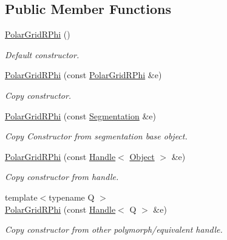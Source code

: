 \subsection*{Public Member Functions}
\begin{DoxyCompactItemize}
\item 
\hyperlink{class_d_d4hep_1_1_geometry_1_1_polar_grid_r_phi_a1943b006410ada69da167db39a382427}{PolarGridRPhi} ()
\begin{DoxyCompactList}\small\item\em Default constructor. \item\end{DoxyCompactList}\item 
\hyperlink{class_d_d4hep_1_1_geometry_1_1_polar_grid_r_phi_ad5916c16a7d6a1b66bb68c752ceae0ad}{PolarGridRPhi} (const \hyperlink{class_d_d4hep_1_1_geometry_1_1_polar_grid_r_phi}{PolarGridRPhi} \&e)
\begin{DoxyCompactList}\small\item\em Copy constructor. \item\end{DoxyCompactList}\item 
\hyperlink{class_d_d4hep_1_1_geometry_1_1_polar_grid_r_phi_aec8a817c925fdd0146eaf53c612e32e4}{PolarGridRPhi} (const \hyperlink{class_d_d4hep_1_1_geometry_1_1_segmentation}{Segmentation} \&e)
\begin{DoxyCompactList}\small\item\em Copy Constructor from segmentation base object. \item\end{DoxyCompactList}\item 
\hyperlink{class_d_d4hep_1_1_geometry_1_1_polar_grid_r_phi_ab27807b9812126c2574356c71dee5c15}{PolarGridRPhi} (const \hyperlink{class_d_d4hep_1_1_handle}{Handle}$<$ \hyperlink{class_t}{Object} $>$ \&e)
\begin{DoxyCompactList}\small\item\em Copy constructor from handle. \item\end{DoxyCompactList}\item 
{\footnotesize template$<$typename Q $>$ }\\\hyperlink{class_d_d4hep_1_1_geometry_1_1_polar_grid_r_phi_a0a844c67b09ed51648cba4547348ab04}{PolarGridRPhi} (const \hyperlink{class_d_d4hep_1_1_handle}{Handle}$<$ Q $>$ \&e)
\begin{DoxyCompactList}\small\item\em Copy constructor from other polymorph/equivalent handle. \item\end{DoxyCompactList}\item 

\end{DoxyCompactItemize}
